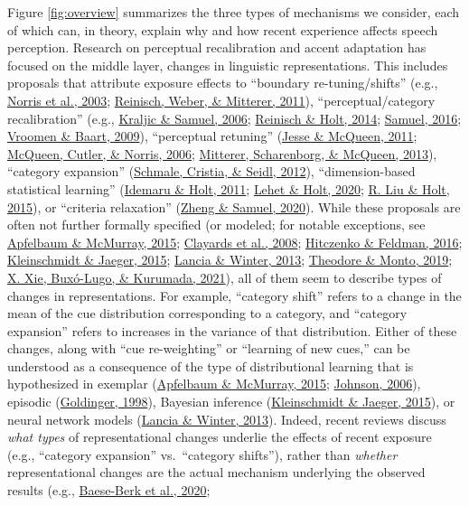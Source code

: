 \documentclass[
  11pt,
  english,
  man,floatsintext]{apa6}
\begin{document}
Figure \ref{fig:overview} summarizes the three types of mechanisms we consider, each of which can, in theory, explain why and how recent experience affects speech perception. Research on perceptual recalibration and accent adaptation has focused on the middle layer, changes in linguistic representations. This includes proposals that attribute exposure effects to ``boundary re-tuning/shifts'' (e.g., \protect\hyperlink{ref-norris2003}{Norris et al., 2003}; \protect\hyperlink{ref-reinisch2011}{Reinisch, Weber, \& Mitterer, 2011}), ``perceptual/category recalibration'' (e.g., \protect\hyperlink{ref-kraljic-samuel2006}{Kraljic \& Samuel, 2006}; \protect\hyperlink{ref-reinisch-holt2014}{Reinisch \& Holt, 2014}; \protect\hyperlink{ref-samuel2016}{Samuel, 2016}; \protect\hyperlink{ref-vroomen-baart2009}{Vroomen \& Baart, 2009}), ``perceptual retuning'' (\protect\hyperlink{ref-jesse-mcqueen2011}{Jesse \& McQueen, 2011}; \protect\hyperlink{ref-mcqueen2006}{McQueen, Cutler, \& Norris, 2006}; \protect\hyperlink{ref-mitterer2013}{Mitterer, Scharenborg, \& McQueen, 2013}), ``category expansion'' (\protect\hyperlink{ref-schmale2012}{Schmale, Cristia, \& Seidl, 2012}), ``dimension-based statistical learning'' (\protect\hyperlink{ref-idemaru-holt2011}{Idemaru \& Holt, 2011}; \protect\hyperlink{ref-lehet-holt2020}{Lehet \& Holt, 2020}; \protect\hyperlink{ref-liu-holt2015}{R. Liu \& Holt, 2015}), or ``criteria relaxation'' (\protect\hyperlink{ref-zheng-samuel2020}{Zheng \& Samuel, 2020}). While these proposals are often not further formally specified (or modeled; for notable exceptions, see \protect\hyperlink{ref-apfelbaum-mcmurray2015}{Apfelbaum \& McMurray, 2015}; \protect\hyperlink{ref-clayards2008}{Clayards et al., 2008}; \protect\hyperlink{ref-hitczenko-feldman2016}{Hitczenko \& Feldman, 2016}; \protect\hyperlink{ref-kleinschmidt-jaeger2015}{Kleinschmidt \& Jaeger, 2015}; \protect\hyperlink{ref-lancia-winter2013}{Lancia \& Winter, 2013}; \protect\hyperlink{ref-theodore-monto2019}{Theodore \& Monto, 2019}; \protect\hyperlink{ref-xie2021cognition}{X. Xie, Buxó-Lugo, \& Kurumada, 2021}), all of them seem to describe types of changes in representations. For example, ``category shift'' refers to a change in the mean of the cue distribution corresponding to a category, and ``category expansion'' refers to increases in the variance of that distribution. Either of these changes, along with ``cue re-weighting'' or ``learning of new cues,'' can be understood as a consequence of the type of distributional learning that is hypothesized in exemplar (\protect\hyperlink{ref-apfelbaum-mcmurray2015}{Apfelbaum \& McMurray, 2015}; \protect\hyperlink{ref-johnson2006}{Johnson, 2006}), episodic (\protect\hyperlink{ref-goldinger1998}{Goldinger, 1998}), Bayesian inference (\protect\hyperlink{ref-kleinschmidt-jaeger2015}{Kleinschmidt \& Jaeger, 2015}), or neural network models (\protect\hyperlink{ref-lancia-winter2013}{Lancia \& Winter, 2013}). Indeed, recent reviews discuss \emph{what types} of representational changes underlie the effects of recent exposure (e.g., ``category expansion'' vs.~``category shifts''), rather than \emph{whether} representational changes are the actual mechanism underlying the observed results (e.g., \protect\hyperlink{ref-baeseberk2020}{Baese-Berk et al., 2020}; 
\end{document}
